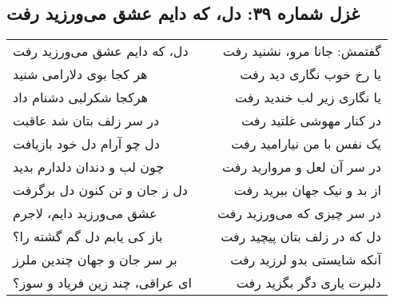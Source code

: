 \begin{center}
\section*{غزل شماره ۳۹: دل، که دایم عشق می‌ورزید رفت}
\label{sec:039}
\begin{longtable}{l p{0.5cm} r}
دل، که دایم عشق می‌ورزید رفت
&&
گفتمش: جانا مرو، نشنید رفت
\\
هر کجا بوی دلارامی شنید
&&
یا رخ خوب نگاری دید رفت
\\
هرکجا شکرلبی دشنام داد
&&
یا نگاری زیر لب خندید رفت
\\
در سر زلف بتان شد عاقبت
&&
در کنار مهوشی غلتید رفت
\\
دل چو آرام دل خود بازیافت
&&
یک نفس با من نیارامید رفت
\\
چون لب و دندان دلدارم بدید
&&
در سر آن لعل و مروارید رفت
\\
دل ز جان و تن کنون دل برگرفت
&&
از بد و نیک جهان ببرید رفت
\\
عشق می‌ورزید دایم، لاجرم
&&
در سر چیزی که می‌ورزید رفت
\\
باز کی یابم دل گم گشته را؟
&&
دل که در زلف بتان پیچید رفت
\\
بر سر جان و جهان چندین ملرز
&&
آنکه شایستی بدو لرزید رفت
\\
ای عراقی، چند زین فریاد و سوز؟
&&
دلبرت یاری دگر بگزید رفت
\\
\end{longtable}
\end{center}
